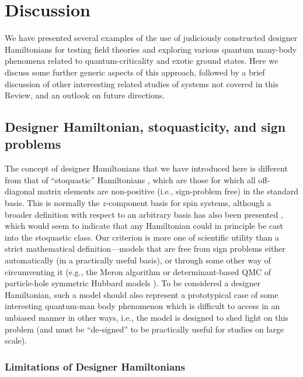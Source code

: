 \documentclass[10pt,pre,aps,twocolumn,showpacs,superscriptaddress,floatfix]{revtex4-1}
\begin{document}
\section{Discussion}
\label{sec:discussion}

We have presented several examples of the use of judiciously constructed designer Hamiltonians for testing field theories
and exploring various quantum many-body phenomena related to quantum-criticality and exotic ground states. Here we discuss some further 
generic aspects of this approach, followed by a brief discussion of other intereesting related studies of systems not covered in this 
Review, and an outlook on future directions.

\subsection{Designer Hamiltonian, stoquasticity, and sign problems}

The concept of designer Hamiltonians that we have introduced here is different from that of ``stoquastic'' Hamiltonians \cite{Terhal08}, which are
those for which all off-diagonal matrix elements are non-positive (i.e., sign-problem free) in the standard basis.  This is normally the  $z$-component 
basis for spin systems, although a broader definition with respect to an arbitrary basis has also been presented \cite{Terhal09}, which would seem to 
indicate that any Hamiltonian could in principle be cast into the stoquastic class. Our criterion is more one of scientific utility than a strict mathematical 
definition---models that are free from sign problems either automatically (in a practically useful basis), or through some 
other way of circumventing it (e.g., the Meron algorithm \cite{Chandrasekharan99} or determinant-based QMC of particle-hole symmetric Hubbard 
models \cite{White89,Assaad05,Assaad07}). To be considered a designer Hamiltonian, such a model should also represent a prototypical case of 
some interesting quantum-man body phenomenon which is difficult to access in an unbiased manner in other ways, i.e., the model is designed to shed
light on this problem (and must be ``de-signed'' to be practically useful for studies on large scale).

\subsubsection{Limitations of Designer Hamiltonians}
\end{document}

